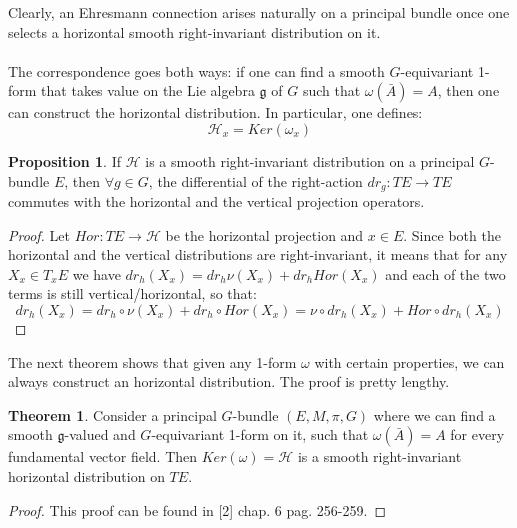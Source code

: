 \documentclass[12pt,a4paper]{report}
\theoremstyle{definition}
\theoremstyle{Theorem}
\newtheorem{Theo}[Def]{Theorem}
\newtheorem{Prop}[Def]{Proposition}
\theoremstyle{definition}
\theoremstyle{definition}
\begin{document}
	Clearly, an Ehresmann connection arises naturally on a principal bundle once one selects a horizontal smooth right-invariant distribution on it.\\
	\\
	The correspondence goes both ways: if one can find a smooth $G$-equivariant 1-form that takes value on the Lie algebra $\mathfrak{g}$ of $G$ such that $\omega(\bar{A})=A$, then one can construct the horizontal distribution. In particular, one defines: $$\mathcal{H}_{x}=Ker(\omega_{x})$$
	\begin{Prop}\label{Prop_5.3.1}
		If $\mathcal{H}$ is a smooth right-invariant distribution on a principal $G$-bundle $E$, then $\forall g\in G$, the differential of the right-action $dr_g:TE\rightarrow TE$ commutes with the horizontal and the vertical projection operators.
	\end{Prop}
	\begin{proof}
		Let $Hor:TE\rightarrow\mathcal{H}$ be the horizontal projection and $x\in E$. Since both the horizontal and the vertical distributions are right-invariant, it means that for any $X_{x}\in T_xE$ we have $dr_h( X_{x})=dr_h \nu(X_{x})+dr_hHor(X_{x})$ and each of the two terms is still vertical/horizontal, so that:
		$$dr_h (X_{x})=dr_h\circ \nu(X_{x})+dr_h\circ Hor(X_{x})=
		\nu\circ dr_h(X_{x})+Hor\circ dr_h(X_{x})$$
	\end{proof}
	The next theorem shows that given any 1-form $\omega$ with certain properties, we can always construct an horizontal distribution. The proof is pretty lengthy.
	\begin{Theo}
		Consider a principal $G$-bundle $(E,M,\pi,G)$ where we can find a smooth $\mathfrak{g}$-valued and $G$-equivariant 1-form on it, such that $\omega(\bar{A})=A$ for every fundamental vector field. Then $Ker(\omega)=\mathcal{H}$ is a smooth right-invariant horizontal distribution on $TE$.
	\end{Theo}
	\begin{proof}
		This proof can be found in [2] chap. 6 pag. 256-259.
	\end{proof}
\end{document}
